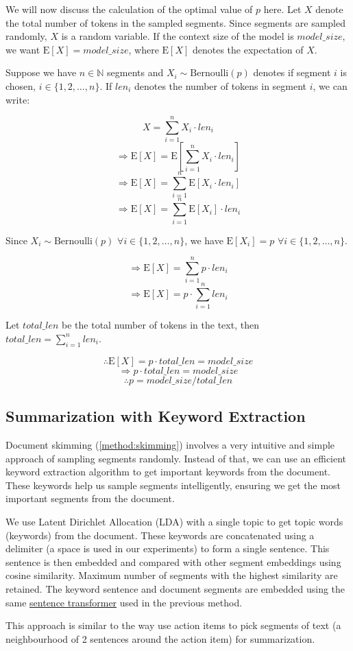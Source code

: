 We will now discuss the calculation of the optimal value of $p$ here.
Let $X$ denote the total number of tokens in the sampled segments.
Since segments are sampled randomly, $X$ is a random variable.
If the context size of the model is $model\_size$, we want $\mathrm{E}[X] = model\_size$,
where $\mathrm{E}[X]$ denotes the expectation of $X$.

Suppose we have $n \in \mathbb{N}$ segments and $X_i \sim \mathrm{Bernoulli}(p)$ denotes
if segment $i$ is chosen, $i \in \{1, 2, \dots, n\}$.
If $len_i$ denotes the number of tokens in segment $i$, we can write:

\[ X = \sum_{i = 1}^{n} X_i \cdot len_i \]
\[ \Rightarrow \mathrm{E}[X] = \mathrm{E}[\sum_{i = 1}^{n} X_i \cdot len_i] \]
\[ \Rightarrow \mathrm{E}[X] = \sum_{i = 1}^{n} \mathrm{E}[X_i \cdot len_i] \]
\[ \Rightarrow \mathrm{E}[X] = \sum_{i = 1}^{n} \mathrm{E}[X_i] \cdot len_i \]

Since $X_i \sim \mathrm{Bernoulli}(p)$ $\forall i \in \{1, 2, \dots, n\}$, we
have $\mathrm{E}[X_i] = p$ $\forall i \in \{1, 2, \dots, n\}$.

\[ \Rightarrow \mathrm{E}[X] = \sum_{i = 1}^{n} p \cdot len_i \]
\[ \Rightarrow \mathrm{E}[X] = p \cdot \sum_{i = 1}^{n} len_i \]

Let $total\_len$ be the total number of tokens in the text, then
$total\_len = \sum_{i = 1}^{n} len_i$.

\[ \therefore \mathrm{E}[X] = p \cdot total\_len = model\_size \]
\[ \Rightarrow p \cdot total\_len = model\_size \]
\[ \therefore p = model\_size / total\_len \]


\subsection{Summarization with Keyword Extraction}
\label{method:keyword}

Document skimming (\ref{method:skimming}) involves a very intuitive and simple approach of
sampling segments randomly.
Instead of that, we can use an efficient keyword extraction algorithm to get important keywords
from the document.
These keywords help us sample segments intelligently, ensuring we get the most important
segments from the document.

We use Latent Dirichlet Allocation (LDA) \cite{blei2003latent} with a single topic to get topic
words (keywords) from the document.
These keywords are concatenated using a delimiter (a space is used in our experiments) to form a
single sentence.
This sentence is then embedded and compared with other segment embeddings using cosine similarity.
Maximum number of segments with the highest similarity are retained.
The keyword sentence and document segments are embedded using the same
\href{https://huggingface.co/sentence-transformers/all-MiniLM-L6-v2}{sentence transformer}
used in the previous method.

This approach is similar to the way \citet{golia2024action} use action items to pick segments
of text (a neighbourhood of 2 sentences around the action item) for summarization.
